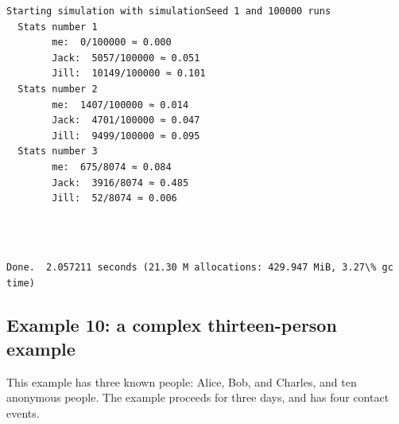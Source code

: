 \documentclass[11pt]{article}
\begin{document}
    \begin{Verbatim}[commandchars=\\\{\}]
Starting simulation with simulationSeed 1 and 100000 runs
  Stats number 1
        me:  0/100000 ≈ 0.000
        Jack:  5057/100000 ≈ 0.051
        Jill:  10149/100000 ≈ 0.101
  Stats number 2
        me:  1407/100000 ≈ 0.014
        Jack:  4701/100000 ≈ 0.047
        Jill:  9499/100000 ≈ 0.095
  Stats number 3
        me:  675/8074 ≈ 0.084
        Jack:  3916/8074 ≈ 0.485
        Jill:  52/8074 ≈ 0.006
    \end{Verbatim}

    \begin{center}
    \end{center}
    { \hspace*{\fill} \\}
    
    \begin{Verbatim}[commandchars=\\\{\}]

Done.  2.057211 seconds (21.30 M allocations: 429.947 MiB, 3.27\% gc time)
    \end{Verbatim}
\newpage
    \hypertarget{example-10-a-complex-thirteen-person-example}{%
\subsection{Example 10: a complex thirteen-person
example}\label{example-10-a-complex-thirteen-person-example}}

This example has three known people: Alice, Bob, and Charles, and ten
anonymous people. The example proceeds for three days, and has four
contact events.
\end{document}
